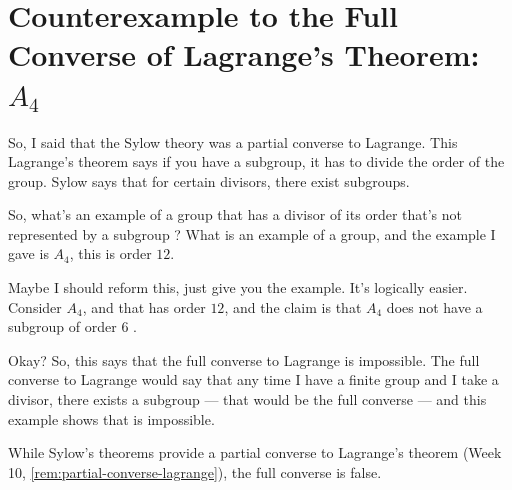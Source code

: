 \section{Counterexample to the Full Converse of Lagrange's Theorem: \texorpdfstring{$A_4$}{A4}}

\begin{speech}[00:15:33 - 00:16:55]
So, I said that the Sylow theory was a partial converse to Lagrange. This Lagrange's theorem says if you have a subgroup, it has to divide the order of the group. Sylow says that for certain divisors, there exist subgroups.

So, what's an example of a group that has a divisor of its order that's not represented by a subgroup ? What is an example of a group, and the example I gave is $A_4$, this is order $12$.

Maybe I should reform this, just give you the example. It's logically easier. Consider $A_4$, and that has order $12$, and the claim is that $A_4$ does not have a subgroup of order $6$ .

Okay? So, this says that the full converse to Lagrange is impossible. The full converse to Lagrange would say that any time I have a finite group and I take a divisor, there exists a subgroup --- that would be the full converse --- and this example shows that is impossible.
\end{speech}

\begin{content}

While Sylow's theorems provide a partial converse to Lagrange's theorem (Week 10, \cref{rem:partial-converse-lagrange}), the full converse is false.

\end{content}

